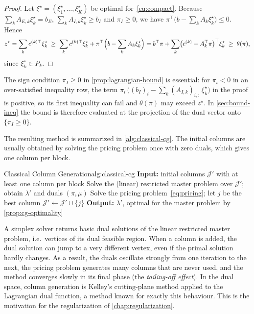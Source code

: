 \begin{proof}
Let $\xi^\star = (\xi^\star_1,\dots,\xi^\star_K)$ be optimal for~\eqref{eq:compact}. Because $\sum_k A_{E,k}\xi^\star_k = b_E$,
$\sum_k A_{I,k}\xi^\star_k\ge b_I$ and $\pi_I\ge0$, we have
$\pi^\top\bigl(b - \sum_k A_k \xi_k^\star\bigr)\le 0$. Hence
\[
z^\star = \sum_k c^{(k)\top} \xi^\star_k
\;\ge\; \sum_k c^{(k)\top} \xi^\star_k + \pi^\top\Bigl(b - \sum_k A_k \xi_k^\star\Bigr)
= b^\top\pi + \sum_k\bigl(c^{(k)} - A_k^\top\pi\bigr)^\top \xi^\star_k
\;\ge\; \theta(\pi),
\]
since $\xi_k^\star\in P_k$. 
\end{proof}

\begin{remark} \label{rem:bound-sign}
The sign condition $\pi_I\ge0$ in \cref{prop:lagrangian-bound} is essential: for $\pi_i<0$
in an over-satisfied inequality row, the term $\pi_i\,\bigl((b_I)_i - \sum_k (A_{I,k})_{i,:}\,\xi^\star_k\bigr)$
in the proof is positive, so its first inequality can fail and $\theta(\pi)$ may exceed $z^\star$. In \cref{sec:bound-ineq} the bound is therefore evaluated at the projection of
the dual vector onto $\{\pi_I\ge0\}$.
\end{remark}

The resulting method is summarized in \cref{alg:classical-cg}. The initial columns are
usually obtained by solving the pricing problem once with zero duals, which gives one
column per block.

\begin{algobox}{Classical Column Generation}{alg:classical-cg}
\State \textbf{Input:} initial columns $\mathcal{J}'$ with at least one column per block
\Repeat
    \State Solve the (linear) restricted master problem over $\mathcal{J}'$; obtain
           $\lambda'$ and duals $(\pi,\mu)$
        \State Solve the pricing problem~\eqref{eq:pricing}; let $j$ be the best column
            \State $\mathcal{J}'\gets\mathcal{J}'\cup\{j\}$
        \EndIf
    \EndFor
{}
\State \textbf{Output:} $\lambda'$, optimal for the master problem by \cref{prop:cg-optimality}
\end{algobox}

\begin{remark}[Instability] \label{rem:instability}
A simplex solver returns basic dual solutions of the linear restricted master problem,
i.e.\ vertices of its dual feasible region. When a column is added, the dual solution can jump
to a very different vertex,
even if the primal solution hardly changes. As a result, the duals oscillate strongly from
one iteration to the next, the pricing problem generates many columns that are never used,
and the method converges slowly in its final phase (the \emph{tailing-off effect}). In the
dual space, column generation is Kelley's cutting-plane method
\cite{kelley1960cutting} applied to the Lagrangian dual function, a method known for exactly
this behaviour. This is the motivation for the regularization of \cref{chap:regularization}.
\end{remark}


